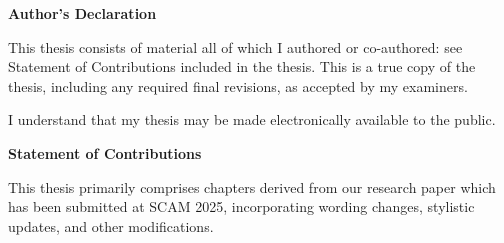 \cleardoublepage %
 

 \begin{center}\textbf{Author's Declaration}\end{center}

 \noindent
This thesis consists of material all of which I authored or co-authored: see Statement of
Contributions included in the thesis. This is a true copy of the thesis, including any required final revisions, as accepted by my examiners.
 \noindent  
  \bigskip
  
  \noindent
I understand that my thesis may be made electronically available to the public.

\cleardoublepage
{}    %

 \begin{center}\textbf{Statement of Contributions}\end{center}

This thesis primarily comprises chapters derived from our research paper which has been
submitted at SCAM 2025, incorporating wording changes, stylistic updates, and other
modifications.

